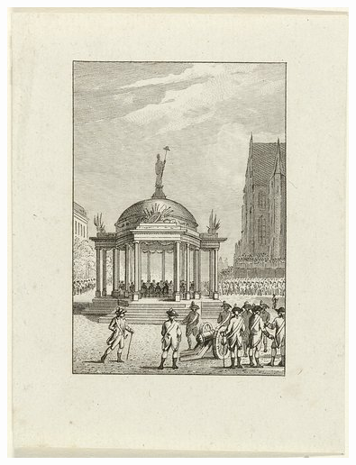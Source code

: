 \begin{figure}[!htb]
  \includegraphics[width=\linewidth]{./Images/Chapter04/example_2.jpg}
\endminipage
{}

\end{figure}
